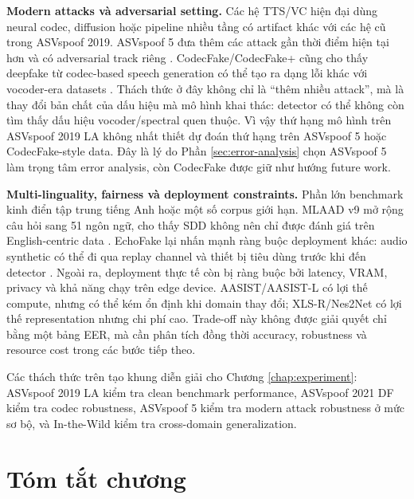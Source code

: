 \textbf{Modern attacks và adversarial setting.} Các hệ TTS/VC hiện đại dùng neural codec, diffusion hoặc pipeline nhiều tầng có artifact khác với các hệ cũ trong ASVspoof 2019. ASVspoof 5 đưa thêm các attack gần thời điểm hiện tại hơn và có adversarial track riêng \cite{asvspoof5_arxiv2024,asvspoof5_design,asvspoof5_eval}. CodecFake/CodecFake+ cũng cho thấy deepfake từ codec-based speech generation có thể tạo ra dạng lỗi khác với vocoder-era datasets \cite{codecfake,codecfakeplus}. Thách thức ở đây không chỉ là ``thêm nhiều attack'', mà là thay đổi bản chất của dấu hiệu mà mô hình khai thác: detector có thể không còn tìm thấy dấu hiệu vocoder/spectral quen thuộc. Vì vậy thứ hạng mô hình trên ASVspoof 2019 LA không nhất thiết dự đoán thứ hạng trên ASVspoof 5 hoặc CodecFake-style data. Đây là lý do Phần \ref{sec:error-analysis} chọn ASVspoof 5 làm trọng tâm error analysis, còn CodecFake được giữ như hướng future work.

\textbf{Multi-linguality, fairness và deployment constraints.} Phần lớn benchmark kinh điển tập trung tiếng Anh hoặc một số corpus giới hạn. MLAAD v9 mở rộng câu hỏi sang 51 ngôn ngữ, cho thấy SDD không nên chỉ được đánh giá trên English-centric data \cite{mlaad}. EchoFake lại nhấn mạnh ràng buộc deployment khác: audio synthetic có thể đi qua replay channel và thiết bị tiêu dùng trước khi đến detector \cite{echofake}. Ngoài ra, deployment thực tế còn bị ràng buộc bởi latency, VRAM, privacy và khả năng chạy trên edge device. AASIST/AASIST-L có lợi thế compute, nhưng có thể kém ổn định khi domain thay đổi; XLS-R/Nes2Net có lợi thế representation nhưng chi phí cao. Trade-off này không được giải quyết chỉ bằng một bảng EER, mà cần phân tích đồng thời accuracy, robustness và resource cost trong các bước tiếp theo.

Các thách thức trên tạo khung diễn giải cho Chương \ref{chap:experiment}: ASVspoof 2019 LA kiểm tra clean benchmark performance, ASVspoof 2021 DF kiểm tra codec robustness, ASVspoof 5 kiểm tra modern attack robustness ở mức sơ bộ, và In-the-Wild kiểm tra cross-domain generalization.

\section{Tóm tắt chương}


